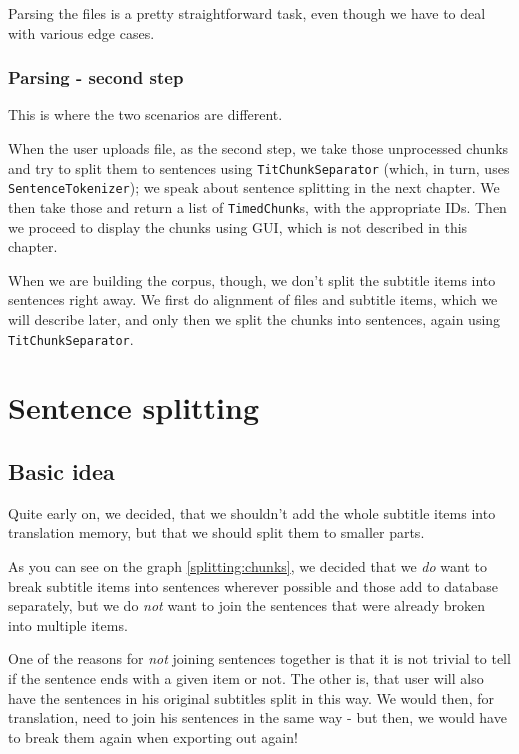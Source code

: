 Parsing the files is a pretty straightforward task, even though we have to deal with various edge cases.


\subsubsection*{Parsing - second step}
This is where the two scenarios are different. 

When the user uploads file, as the second step, we take those unprocessed chunks and try to split them to sentences using \texttt{TitChunkSeparator} (which, in turn, uses \texttt{SentenceTokenizer}); we speak about sentence splitting in the next chapter. We then take those and return a list of \texttt{TimedChunk}s, with the appropriate IDs. Then we proceed to display the chunks using GUI, which is not described in this chapter.

When we are building the corpus, though, we don't split the subtitle items into sentences right away. We first do alignment of files and subtitle items, which we will describe later, and only then we split the chunks into sentences, again using \texttt{TitChunkSeparator}.

\section{Sentence splitting}
\label{sentence_splitting}
\subsection*{Basic idea}
Quite early on, we decided, that we shouldn't add the whole subtitle items into translation memory, but that we should split them to smaller parts.

As you can see on the graph \ref{splitting:chunks}, we decided that we \emph{do} want to break subtitle items into sentences wherever possible and those add to database separately, but we do \emph{not} want to join the sentences that were already broken into multiple items. 

One of the reasons for \emph{not} joining sentences together is that it is not trivial to tell if the sentence ends with a given item or not. The other is, that user will also have the sentences in his original subtitles split in this way. We would then, for translation, need to join his sentences in the same way - but then, we would have to break them again when exporting out again!

